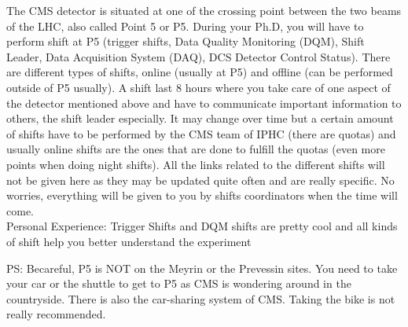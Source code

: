 \documentclass[reprint, a4paper, nofootinbib, amsmath, amssymb, aps]{revtex4-1}
\begin{document}
    The CMS detector is situated at one of the crossing point between the two beams of the LHC, also called Point 5 or P5. During your Ph.D, you will have to perform shift at P5 (trigger shifts, Data Quality Monitoring (DQM), Shift Leader, Data Acquisition System (DAQ), DCS Detector Control Status). There are different types of shifts, online (usually at P5) and offline (can be performed outside of P5 usually). A shift last 8 hours where you take care of one aspect of the detector mentioned above and have to communicate important information to others, the shift leader especially.
    It may change over time but a certain amount of shifts have to be performed by the CMS team of IPHC (there are quotas) and usually online shifts are the ones that are done to fulfill the quotas (even more points when doing night shifts). All the links related to the different shifts will not be given here as they may be updated quite often and are really specific. No worries, everything will be given to you by shifts coordinators when the time will come. \\
    Personal Experience: Trigger Shifts and DQM shifts are pretty cool and all kinds of shift help you better understand the experiment
    
    PS: Becareful, P5 is NOT on the Meyrin or the Prevessin sites. You need to take your car or the shuttle to get to P5 as CMS is wondering around in the countryside. There is also the car-sharing system of CMS. Taking the bike is not really recommended.
    
\end{document}
